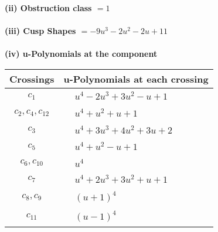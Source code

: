 \documentclass[1p]{elsarticle_modified}
\theoremstyle{definition}
\begin{document}
\flushleft \textbf{(ii) Obstruction class $= 1$}\\~\\
\flushleft \textbf{(iii) Cusp Shapes $= -9 u^3-2 u^2-2 u+11$}\\~\\
\newpage\renewcommand{\arraystretch}{1}
\flushleft \textbf{(iv) u-Polynomials at the component}\newline \\
\begin{tabular}{m{50pt}|m{274pt}}
Crossings & \hspace{64pt}u-Polynomials at each crossing \\
\hline $$\begin{aligned}c_{1}\end{aligned}$$&$\begin{aligned}
&u^4-2 u^3+3 u^2- u+1
\end{aligned}$\\
\hline $$\begin{aligned}c_{2},c_{4},c_{12}\end{aligned}$$&$\begin{aligned}
&u^4+u^2+u+1
\end{aligned}$\\
\hline $$\begin{aligned}c_{3}\end{aligned}$$&$\begin{aligned}
&u^4+3 u^3+4 u^2+3 u+2
\end{aligned}$\\
\hline $$\begin{aligned}c_{5}\end{aligned}$$&$\begin{aligned}
&u^4+u^2- u+1
\end{aligned}$\\
\hline $$\begin{aligned}c_{6},c_{10}\end{aligned}$$&$\begin{aligned}
&u^4
\end{aligned}$\\
\hline $$\begin{aligned}c_{7}\end{aligned}$$&$\begin{aligned}
&u^4+2 u^3+3 u^2+u+1
\end{aligned}$\\
\hline $$\begin{aligned}c_{8},c_{9}\end{aligned}$$&$\begin{aligned}
&(u+1)^4
\end{aligned}$\\
\hline $$\begin{aligned}c_{11}\end{aligned}$$&$\begin{aligned}
&(u-1)^4
\end{aligned}$\\
\hline
\end{tabular}\\~\\
\end{document}
